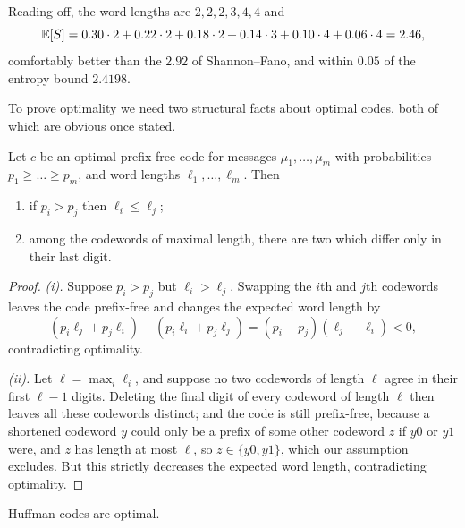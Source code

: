 \documentclass[a4paper]{scrartcl}
\begin{document}
\begin{example}
	Reading off, the word lengths are $2,2,2,3,4,4$ and
	$$\mathbb{E}[S] = 0.30\cdot2 + 0.22\cdot2+0.18\cdot2+0.14\cdot3+0.10\cdot4+0.06\cdot4 = 2.46,$$
	comfortably better than the $2.92$ of Shannon--Fano, and within $0.05$ of the entropy bound $2.4198$.
\end{example}

To prove optimality we need two structural facts about optimal codes, both of which are obvious once stated.

\begin{lemma}\label{lem:optprops}
	Let $c$ be an optimal prefix-free code for messages $\mu_1, \dots, \mu_m$ with probabilities $p_1 \ge \dots \ge p_m$, and word lengths $\ell_1, \dots, \ell_m$. Then
	\begin{enumerate}[label=(\roman*)]
		\item if $p_i > p_j$ then $\ell_i \le \ell_j$;
		\item among the codewords of maximal length, there are two which differ only in their last digit.
	\end{enumerate}
\end{lemma}

\begin{proof}
	\emph{(i).} Suppose $p_i > p_j$ but $\ell_i > \ell_j$. Swapping the $i$th and $j$th codewords leaves the code prefix-free and changes the expected word length by
	$$(p_i \ell_j + p_j \ell_i) - (p_i \ell_i + p_j \ell_j) = (p_i - p_j)(\ell_j - \ell_i) < 0,$$
	contradicting optimality.

	\emph{(ii).} Let $\ell = \max_i \ell_i$, and suppose no two codewords of length $\ell$ agree in their first $\ell - 1$ digits. Deleting the final digit of every codeword of length $\ell$ then leaves all these codewords distinct; and the code is still prefix-free, because a shortened codeword $y$ could only be a prefix of some other codeword $z$ if $y0$ or $y1$ were, and $z$ has length at most $\ell$, so $z \in \{y0, y1\}$, which our assumption excludes. But this strictly decreases the expected word length, contradicting optimality.
\end{proof}

\begin{theorem}
	Huffman codes are optimal.
\end{theorem}
\end{document}
